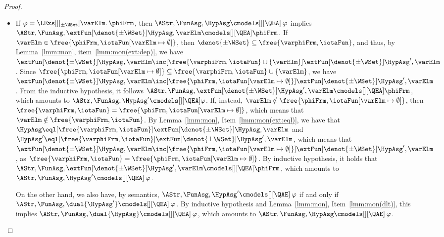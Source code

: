 \documentclass[authoryear]{elsarticle}
\begin{document}
\begin{proof}
\begin{itemize}
  \item If $\varphi = \LExs[][_{\pm\WSet}] \varElm \ldotp
    \phiFrm$, then $\AStr, \FunAsg, \HypAsg \cmodels[][\QEA]\: \varphi$ implies
    $\AStr, \FunAsg, \extFun[\denot{\pm\WSet}]{\HypAsg, \varElm}
    \cmodels[][\QEA] \phiFrm$.
%
    If $\varElm \in \free{\phiFrm,{\iotaFun}[\varElm \mapsto
      \emptyset]}$, then $\denot{\pm\WSet} \subseteq
    \free{\varphiFrm,\iotaFun}$, and thus, by Lemma~\ref{lmm:mon},
    item~\ref{lmm:mon(ext:dep)}, we have $\extFun[\denot{\pm\WSet}]{\HypAsg,
      \varElm} \inc[\free{\varphiFrm,\iotaFun} \cup \{ \varElm \}]
    \extFun[\denot{\pm\WSet}]{\HypAsg', \varElm}$.
    Since $\free{\phiFrm, {\iotaFun}[\varElm \mapsto \emptyset]} \subseteq
    \free{\varphiFrm, \iotaFun} \cup \{ \varElm \}$, we have
    $\extFun[\denot{\pm\WSet}]{\HypAsg, \varElm} \inc[\free{\phiFrm,
      {\iotaFun}[\varElm \mapsto \emptyset]}]
    \extFun[\denot{\pm\WSet}]{\HypAsg', \varElm}$.
    From the inductive hypothesis, it follows $\AStr, \FunAsg,
    \extFun[\denot{\pm\WSet}]{\HypAsg', \varElm} \cmodels[][\QEA] \phiFrm$,
    which amounts to $\AStr, \FunAsg, \HypAsg' \cmodels[][\QEA] \varphi$.
    If, instead, $\varElm \notin \free{\phiFrm,{\iotaFun}[\varElm \mapsto
      \emptyset]}$, then $\free{\varphiFrm,\iotaFun} =
    \free{\phiFrm,{\iotaFun}[\varElm \mapsto \emptyset]}$, which means that
    $\varElm \notin \free{\varphiFrm,\iotaFun}$.
    By Lemma~\ref{lmm:mon}, Item~\ref{lmm:mon(ext:eql)}, we have that $\HypAsg
    \eql[\free{\varphiFrm,\iotaFun}] \extFun[\denot{\pm\WSet}]{\HypAsg,
      \varElm}$ and $\HypAsg' \eql[\free{\varphiFrm,\iotaFun}]
    \extFun[\denot{\pm\WSet}]{\HypAsg', \varElm}$, which means that
    $\extFun[\denot{\pm\WSet}]{\HypAsg, \varElm} \inc[\free{\phiFrm,
      {\iotaFun}[\varElm \mapsto \emptyset]}]
    \extFun[\denot{\pm\WSet}]{\HypAsg', \varElm}$, as
    $\free{\varphiFrm,\iotaFun} = \free{\phiFrm,{\iotaFun}[\varElm \mapsto
      \emptyset]}$.
    By inductive hypothesis, it holds that $\AStr, \FunAsg,
    \extFun[\denot{\pm\WSet}]{\HypAsg', \varElm} \cmodels[][\QEA] \phiFrm$,
    which amounts to $\AStr, \FunAsg, \HypAsg' \cmodels[][\QEA]\: \varphi$.

    On the other hand, we also have, by semantics, $\AStr, \FunAsg, \HypAsg'
    \cmodels[][\QAE]\: \varphi$ if and only if $\AStr, \FunAsg, \dual{\HypAsg'}
    \cmodels[][\QEA]\: \varphi$.
    By inductive hypothesis and Lemma~\ref{lmm:mon}, Item~\ref{lmm:mon(dlt)},
    this implies $\AStr, \FunAsg, \dual{\HypAsg} \cmodels[][\QEA]\: \varphi$,
    which amounts to $\AStr, \FunAsg, \HypAsg \cmodels[][\QAE]\: \varphi$.


\end{itemize}
\end{proof}
\end{document}

